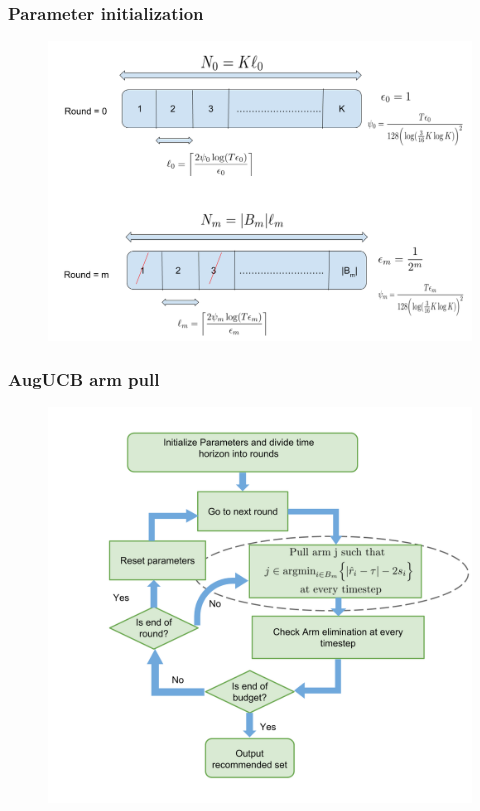 \begin{frame}
\frametitle{Parameter initialization}
\begin{figure}
\includegraphics[scale=0.24]{img/InitReset.png}
\end{figure}
\end{frame}

\begin{frame}
\frametitle{AugUCB arm pull}
\begin{figure}
\includegraphics[scale=0.24]{img/AugUCB_flow_armpull.png}
\end{figure}
\end{frame}

